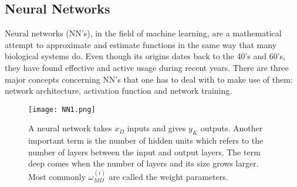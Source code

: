 \subsection{Neural Networks} \label{sec:NNs}
Neural networks (NN's), in the field of machine learning, are a mathematical attempt to approximate and estimate functions in the same way that many biological systems do. Even though its origins dates back to the 40's and 60's, they have found effective and active usage during recent years. There are three major concepts concerning NN's that one has to deal with to make use of them:  network architecture, activation function and network training.
\begin{figure}[!tb] 
\centering 
\texttt{[image: NN1.png]} 
\caption[Neural network example architecture]{A neural network takes $x_D$ inputs and gives $y_K$ outputs. Another important term is the number of hidden units which refers to the number of layers between the input and output layers. The term deep comes when the number of layers and its size grows larger. Most commonly $\omega_{MD}^{(i)}$ are called the weight parameters.}
\label{fig:NNim1} 
\end{figure} 
